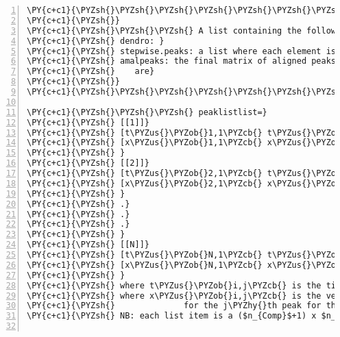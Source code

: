 \begin{Verbatim}[commandchars=\\\{\},codes={\catcode`\$=3\catcode`\^=7\catcode`\_=8},gobble=0,numbers=left,fontfamily=fvm,fontshape=n,fontsize=\footnotesize,tabsize=2]
\PY{c+c1}{\PYZsh{}\PYZsh{}\PYZsh{}\PYZsh{}\PYZsh{}\PYZsh{}\PYZsh{}\PYZsh{}\PYZsh{}\PYZsh{}\PYZsh{}\PYZsh{}\PYZsh{}\PYZsh{}\PYZsh{}\PYZsh{}\PYZsh{}\PYZsh{}\PYZsh{}\PYZsh{}\PYZsh{}\PYZsh{}\PYZsh{}\PYZsh{}\PYZsh{}\PYZsh{}\PYZsh{}\PYZsh{}\PYZsh{}\PYZsh{}\PYZsh{}\PYZsh{}\PYZsh{}\PYZsh{}\PYZsh{}\PYZsh{}\PYZsh{}\PYZsh{}\PYZsh{}\PYZsh{}\PYZsh{}\PYZsh{}\PYZsh{}\PYZsh{}\PYZsh{}\PYZsh{}\PYZsh{}\PYZsh{}\PYZsh{}\PYZsh{}\PYZsh{}\PYZsh{}\PYZsh{}\PYZsh{}\PYZsh{}\PYZsh{}\PYZsh{}\PYZsh{}\PYZsh{}\PYZsh{}\PYZsh{}\PYZsh{}\PYZsh{}\PYZsh{}\PYZsh{}\PYZsh{}\PYZsh{}\PYZsh{}\PYZsh{}\PYZsh{}\PYZsh{}\PYZsh{}\PYZsh{}\PYZsh{}\PYZsh{}\PYZsh{}\PYZsh{}\PYZsh{}\PYZsh{}}
\PY{c+c1}{\PYZsh{}}
\PY{c+c1}{\PYZsh{}\PYZsh{}\PYZsh{} A list containing the following elements:}
\PY{c+c1}{\PYZsh{} dendro: }
\PY{c+c1}{\PYZsh{} stepwise.peaks: a list where each element is the successive amalgamation data}
\PY{c+c1}{\PYZsh{} amalpeaks: the final matrix of aligned peaks. Columns are named spectra, rows}
\PY{c+c1}{\PYZsh{}    are}
\PY{c+c1}{\PYZsh{}}
\PY{c+c1}{\PYZsh{}\PYZsh{}\PYZsh{}\PYZsh{}\PYZsh{}\PYZsh{}\PYZsh{}\PYZsh{}\PYZsh{}\PYZsh{}\PYZsh{}\PYZsh{}\PYZsh{}\PYZsh{}\PYZsh{}\PYZsh{}\PYZsh{}\PYZsh{}\PYZsh{}\PYZsh{}\PYZsh{}\PYZsh{}\PYZsh{}\PYZsh{}\PYZsh{}\PYZsh{}\PYZsh{}\PYZsh{}\PYZsh{}\PYZsh{}\PYZsh{}\PYZsh{}\PYZsh{}\PYZsh{}\PYZsh{}\PYZsh{}\PYZsh{}\PYZsh{}\PYZsh{}\PYZsh{}\PYZsh{}\PYZsh{}\PYZsh{}\PYZsh{}\PYZsh{}\PYZsh{}\PYZsh{}\PYZsh{}\PYZsh{}\PYZsh{}\PYZsh{}\PYZsh{}\PYZsh{}\PYZsh{}\PYZsh{}\PYZsh{}\PYZsh{}\PYZsh{}\PYZsh{}\PYZsh{}\PYZsh{}\PYZsh{}\PYZsh{}\PYZsh{}\PYZsh{}\PYZsh{}\PYZsh{}\PYZsh{}\PYZsh{}\PYZsh{}\PYZsh{}\PYZsh{}\PYZsh{}\PYZsh{}\PYZsh{}\PYZsh{}\PYZsh{}\PYZsh{}\PYZsh{}}

\PY{c+c1}{\PYZsh{}\PYZsh{}\PYZsh{} peaklistlist=}
\PY{c+c1}{\PYZsh{} [[1]]}
\PY{c+c1}{\PYZsh{} [t\PYZus{}\PYZob{}1,1\PYZcb{} t\PYZus{}\PYZob{}1,2\PYZcb{} ... t\PYZus{}\PYZob{}1,n\PYZus{}1\PYZcb{} ]}
\PY{c+c1}{\PYZsh{} [x\PYZus{}\PYZob{}1,1\PYZcb{} x\PYZus{}\PYZob{}1,2\PYZcb{} ... x\PYZus{}\PYZob{}1,n\PYZus{}1\PYZcb{} ]}
\PY{c+c1}{\PYZsh{} }
\PY{c+c1}{\PYZsh{} [[2]]}
\PY{c+c1}{\PYZsh{} [t\PYZus{}\PYZob{}2,1\PYZcb{} t\PYZus{}\PYZob{}2,2\PYZcb{} ... t\PYZus{}\PYZob{}2,n\PYZus{}2\PYZcb{} ]}
\PY{c+c1}{\PYZsh{} [x\PYZus{}\PYZob{}2,1\PYZcb{} x\PYZus{}\PYZob{}2,2\PYZcb{} ... x\PYZus{}\PYZob{}2,n\PYZus{}2\PYZcb{} ]}
\PY{c+c1}{\PYZsh{} }
\PY{c+c1}{\PYZsh{} .}
\PY{c+c1}{\PYZsh{} .}
\PY{c+c1}{\PYZsh{} .}
\PY{c+c1}{\PYZsh{} }
\PY{c+c1}{\PYZsh{} [[N]]}
\PY{c+c1}{\PYZsh{} [t\PYZus{}\PYZob{}N,1\PYZcb{} t\PYZus{}\PYZob{}N,2\PYZcb{} ... t\PYZus{}\PYZob{}N,n\PYZus{}N\PYZcb{} ]}
\PY{c+c1}{\PYZsh{} [x\PYZus{}\PYZob{}N,1\PYZcb{} x\PYZus{}\PYZob{}N,2\PYZcb{} ... x\PYZus{}\PYZob{}N,n\PYZus{}N\PYZcb{} ]}
\PY{c+c1}{\PYZsh{} }
\PY{c+c1}{\PYZsh{} where t\PYZus{}\PYZob{}i,j\PYZcb{} is the time point j\PYZhy{}th peak for the i\PYZhy{}th spectrum}
\PY{c+c1}{\PYZsh{} where x\PYZus{}\PYZob{}i,j\PYZcb{} is the vector of intensities (nComp long i.e. nComp x 1 matrix) }
\PY{c+c1}{\PYZsh{} 				for the j\PYZhy{}th peak for the i\PYZhy{}th spectrum}
\PY{c+c1}{\PYZsh{} NB: each list item is a ($n_{Comp}$+1) x $n_N$ matrix}


\end{Verbatim}
